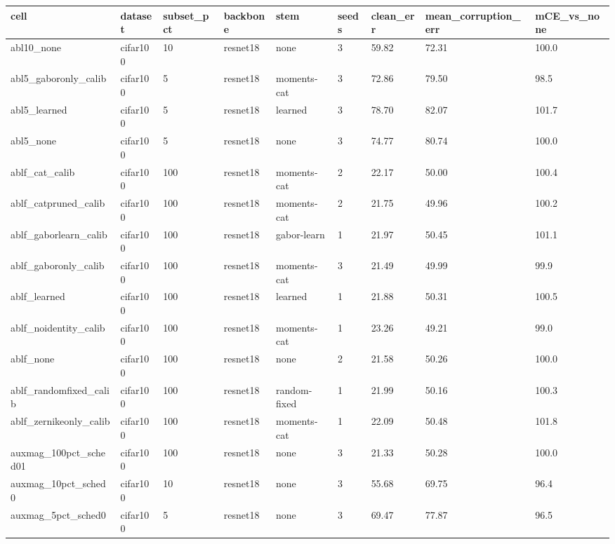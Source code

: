 \begin{tabular}{lllllllll}
\toprule
cell & dataset & subset\_pct & backbone & stem & seeds & clean\_err & mean\_corruption\_err & mCE\_vs\_none \\
\midrule
abl10_none & cifar100 & 10 & resnet18 & none & 3 & 59.82 & 72.31 & 100.0 \\
abl5_gaboronly_calib & cifar100 & 5 & resnet18 & moments-cat & 3 & 72.86 & 79.50 & 98.5 \\
abl5_learned & cifar100 & 5 & resnet18 & learned & 3 & 78.70 & 82.07 & 101.7 \\
abl5_none & cifar100 & 5 & resnet18 & none & 3 & 74.77 & 80.74 & 100.0 \\
ablf_cat_calib & cifar100 & 100 & resnet18 & moments-cat & 2 & 22.17 & 50.00 & 100.4 \\
ablf_catpruned_calib & cifar100 & 100 & resnet18 & moments-cat & 2 & 21.75 & 49.96 & 100.2 \\
ablf_gaborlearn_calib & cifar100 & 100 & resnet18 & gabor-learn & 1 & 21.97 & 50.45 & 101.1 \\
ablf_gaboronly_calib & cifar100 & 100 & resnet18 & moments-cat & 3 & 21.49 & 49.99 & 99.9 \\
ablf_learned & cifar100 & 100 & resnet18 & learned & 1 & 21.88 & 50.31 & 100.5 \\
ablf_noidentity_calib & cifar100 & 100 & resnet18 & moments-cat & 1 & 23.26 & 49.21 & 99.0 \\
ablf_none & cifar100 & 100 & resnet18 & none & 2 & 21.58 & 50.26 & 100.0 \\
ablf_randomfixed_calib & cifar100 & 100 & resnet18 & random-fixed & 1 & 21.99 & 50.16 & 100.3 \\
ablf_zernikeonly_calib & cifar100 & 100 & resnet18 & moments-cat & 1 & 22.09 & 50.48 & 101.8 \\
auxmag_100pct_sched01 & cifar100 & 100 & resnet18 & none & 3 & 21.33 & 50.28 & 100.0 \\
auxmag_10pct_sched0 & cifar100 & 10 & resnet18 & none & 3 & 55.68 & 69.75 & 96.4 \\
auxmag_5pct_sched0 & cifar100 & 5 & resnet18 & none & 3 & 69.47 & 77.87 & 96.5 \\
\bottomrule
\end{tabular}
